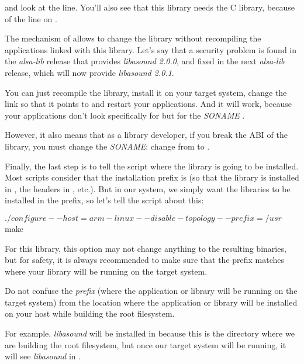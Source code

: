 and look at the  line. You'll also see that this
library needs the C library, because of the  line on
.

The mechanism of  allows to change the library without
recompiling the applications linked with this library. Let's say that
a security problem is found in the {\em alsa-lib} release that provides
{\em libasound 2.0.0}, and fixed in the next {\em alsa-lib} release, which will
now provide {\em libasound 2.0.1}.

You can just recompile the library, install it on your target system,
change the  link so that it points to
 and restart your applications. And it will
work, because your applications don't look specifically for
 but for the {\em SONAME}
.

However, it also means that as a library developer, if you break the
ABI of the library, you must change the {\em SONAME}: change from
 to .

Finally, the last step is to tell the  script where the
library is going to be installed. Most  scripts consider that
the installation prefix is  (so that the library is
installed in , the headers in
, etc.). But in our system, we simply want
the libraries to be installed in the  prefix, so let's tell
the  script about this:

\begin{bashinput}
$ ./configure --host=arm-linux --disable-topology --prefix=/usr
$ make
\end{bashinput}

For this library, this option may not change anything to the resulting
binaries, but for safety, it is always recommended to make sure that
the prefix matches where your library will be running on the target
system.

Do not confuse the {\em prefix} (where the application or library will
be running on the target system) from the location where the
application or library will be installed on your host while building
the root filesystem.

For example, {\em libasound} will be installed in
 because this is
the directory where we are building the root filesystem, but once our
target system will be running, it will see {\em libasound} in
.

